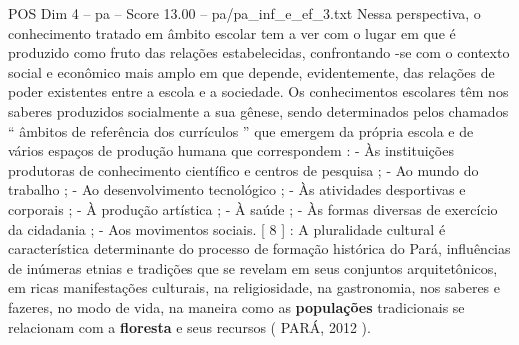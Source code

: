 \begin{textsample}{POS Dim 4 – pa – Score 13.00 – pa/pa\_inf\_e\_ef\_3.txt}
Nessa perspectiva, o conhecimento tratado em âmbito escolar tem a ver com o lugar em que é produzido como fruto das relações estabelecidas, confrontando -se com o contexto social e econômico mais amplo em que depende, evidentemente, das relações de poder existentes entre a escola e a sociedade.
Os conhecimentos escolares têm nos saberes produzidos socialmente a sua gênese, sendo determinados pelos chamados “ âmbitos de referência dos currículos ” que emergem da própria escola e de vários espaços de produção humana que correspondem : - Às instituições produtoras de conhecimento científico e centros de pesquisa ; - Ao mundo do trabalho ; - Ao desenvolvimento tecnológico ; - Às atividades desportivas e corporais ; - À produção artística ; - À saúde ; - Às formas diversas de exercício da cidadania ; - Aos movimentos sociais. [ 8 ] : A pluralidade cultural é característica determinante do processo de formação histórica do Pará, influências de inúmeras etnias e tradições que se revelam em seus conjuntos arquitetônicos, em ricas manifestações culturais, na religiosidade, na gastronomia, nos saberes e fazeres, no modo de vida, na maneira como as \textbf{populações} tradicionais se relacionam com a \textbf{floresta} e seus recursos ( PARÁ, 2012 ).

\end{textsample}
